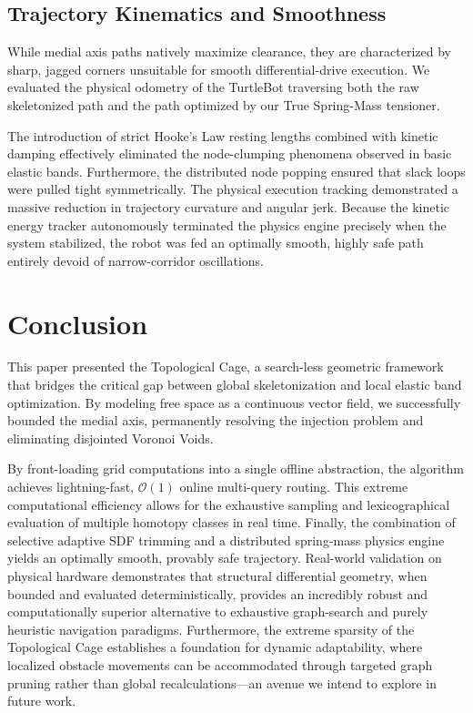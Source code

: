 \documentclass[letterpaper, 10 pt, conference]{IEEEtran}
\begin{document}
\subsection{Trajectory Kinematics and Smoothness}
While medial axis paths natively maximize clearance, they are characterized by sharp, jagged corners unsuitable for smooth differential-drive execution. We evaluated the physical odometry of the TurtleBot traversing both the raw skeletonized path and the path optimized by our True Spring-Mass tensioner.

The introduction of strict Hooke's Law resting lengths combined with kinetic damping effectively eliminated the node-clumping phenomena observed in basic elastic bands. Furthermore, the distributed node popping ensured that slack loops were pulled tight symmetrically. The physical execution tracking demonstrated a massive reduction in trajectory curvature and angular jerk. Because the kinetic energy tracker autonomously terminated the physics engine precisely when the system stabilized, the robot was fed an optimally smooth, highly safe path entirely devoid of narrow-corridor oscillations.

\section{Conclusion}
This paper presented the Topological Cage, a search-less geometric framework that bridges the critical gap between global skeletonization and local elastic band optimization. By modeling free space as a continuous vector field, we successfully bounded the medial axis, permanently resolving the injection problem and eliminating disjointed Voronoi Voids. 

By front-loading grid computations into a single offline abstraction, the algorithm achieves lightning-fast, $\mathcal{O}(1)$ online multi-query routing. This extreme computational efficiency allows for the exhaustive sampling and lexicographical evaluation of multiple homotopy classes in real time. Finally, the combination of selective adaptive SDF trimming and a distributed spring-mass physics engine yields an optimally smooth, provably safe trajectory. Real-world validation on physical hardware demonstrates that structural differential geometry, when bounded and evaluated deterministically, provides an incredibly robust and computationally superior alternative to exhaustive graph-search and purely heuristic navigation paradigms. Furthermore, the extreme sparsity of the Topological Cage establishes a foundation for dynamic adaptability, where localized obstacle movements can be accommodated through targeted graph pruning rather than global recalculations—an avenue we intend to explore in future work.
\end{document}
